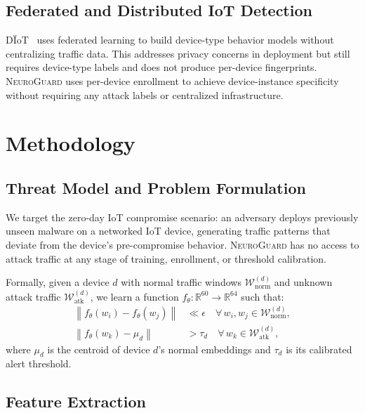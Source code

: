 \documentclass[journal,10pt,twoside]{IEEEtran}
\newcommand{\neuroguard}{\textsc{NeuroGuard}}
\newcommand{\norm}[1]{\left\lVert #1 \right\rVert}
\newcommand{\R}{\mathbb{R}}
\begin{document}
\subsection{Federated and Distributed IoT Detection}

D\"{I}oT~\cite{nguyen2019diot} uses federated learning to build device-type
behavior models without centralizing traffic data.
This addresses privacy concerns in deployment but still requires
device-type labels and does not produce per-device fingerprints.
\neuroguard{} uses per-device enrollment to achieve device-instance
specificity without requiring any attack labels or centralized infrastructure.

\section{Methodology}
\label{sec:method}

\subsection{Threat Model and Problem Formulation}

We target the zero-day IoT compromise scenario: an adversary deploys
previously unseen malware on a networked IoT device, generating traffic
patterns that deviate from the device's pre-compromise behavior.
\neuroguard{} has no access to attack traffic at any stage of training,
enrollment, or threshold calibration.

Formally, given a device $d$ with normal traffic windows
$\mathcal{W}^{(d)}_{\text{norm}}$ and unknown attack traffic
$\mathcal{W}^{(d)}_{\text{atk}}$, we learn a function
$f_\theta : \R^{60} \to \R^{64}$ such that:
\begin{align}
  \norm{f_\theta(w_i) - f_\theta(w_j)} &\ll \epsilon
    \quad \forall\, w_i, w_j \in \mathcal{W}^{(d)}_{\text{norm}},
    \label{eq:intra} \\
  \norm{f_\theta(w_k) - \mu_d} &> \tau_d
    \quad \forall\, w_k \in \mathcal{W}^{(d)}_{\text{atk}},
    \label{eq:inter}
\end{align}
where $\mu_d$ is the centroid of device $d$'s normal embeddings and $\tau_d$
is its calibrated alert threshold.

\subsection{Feature Extraction}
\end{document}
